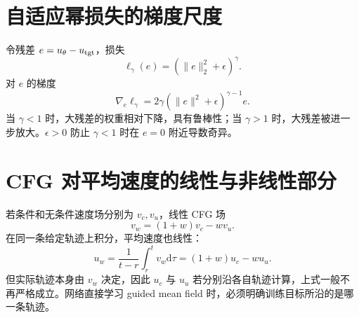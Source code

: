 \documentclass[UTF8,12pt,a4paper,fontset=none]{ctexart}
\numberwithin{equation}{section}
\newcommand{\dd}{\mathrm{d}}
\begin{document}
\section{自适应幂损失的梯度尺度}
令残差 $e=u_\theta-u_{\rm tgt}$，损失
\begin{equation}
 \ell_\gamma(e)=\left(\|e\|_2^2+\epsilon\right)^\gamma.
\end{equation}
对 $e$ 的梯度
\begin{equation}
 \nabla_e\ell_\gamma
 =2\gamma\left(\|e\|^2+\epsilon\right)^{\gamma-1}e.
\end{equation}
当 $\gamma<1$ 时，大残差的权重相对下降，具有鲁棒性；当 $\gamma>1$ 时，大残差被进一步放大。$\epsilon>0$ 防止 $\gamma<1$ 时在 $e=0$ 附近导数奇异。

\section{CFG 对平均速度的线性与非线性部分}
若条件和无条件速度场分别为 $v_c,v_u$，线性 CFG 场
\begin{equation}
 v_w=(1+w)v_c-wv_u.
\end{equation}
在同一条给定轨迹上积分，平均速度也线性：
\begin{equation}
 u_w=\frac1{t-r}\int_r^t v_w\dd\tau
 =(1+w)u_c-wu_u.
\end{equation}
但实际轨迹本身由 $v_w$ 决定，因此 $u_c$ 与 $u_u$ 若分别沿各自轨迹计算，上式一般不再严格成立。网络直接学习 guided mean field 时，必须明确训练目标所沿的是哪一条轨迹。
\end{document}
